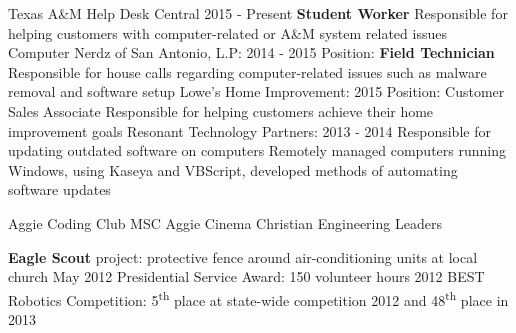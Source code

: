 \documentclass[12pt]{article}
\begin{document}
\begin{flushleft}
\begin{outline}[compactitem]
  \1 Texas A\&M Help Desk Central \hfill 2015 - Present
    \2 \textbf{Student Worker}
    \2 Responsible for helping customers with computer-related or A\&M system related issues
  \1 Computer Nerdz of San Antonio, L.P: \hfill 2014 - 2015
    \2 Position: \textbf{Field Technician}
    \2 Responsible for house calls regarding computer-related issues such as malware removal and software setup
  \1 Lowe's Home Improvement: \hfill 2015
    \2 Position: Customer Sales Associate
    \2 Responsible for helping customers achieve their home improvement goals
  \1 Resonant Technology Partners: \hfill 2013 - 2014
    \2 Responsible for updating outdated software on computers
    \2 Remotely managed computers running Windows, using Kaseya and VBScript, developed methods of automating software updates

  \1 Aggie Coding Club \hfill{}\hspace{1px} MSC Aggie Cinema \hfill{}\hspace{1px} Christian Engineering Leaders

  \1 \textbf{Eagle Scout} project: protective fence around air-conditioning units at local church \hfill May 2012
  \1 Presidential Service Award: 150 volunteer hours \hfill 2012
  \1 BEST Robotics Competition: 5\textsuperscript{th} place at state-wide competition 2012 and 48\textsuperscript{th} place in 2013

\end{outline}
\end{flushleft}
\end{document}
